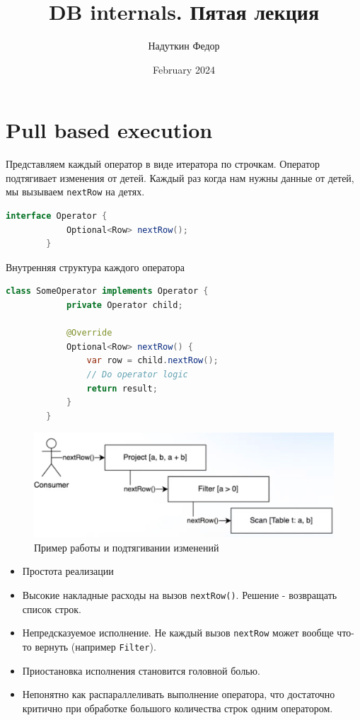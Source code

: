 \documentclass[11pt]{article}
\title{DB internals. Пятая
лекция}
\author{Надуткин Федор }
\date{February 2024}
\begin{document}
    \maketitle
    \newpage


    \section{Pull based execution}

    Представляем каждый оператор в виде итератора по строчкам.
    Оператор подтягивает изменения от детей.
    Каждый раз когда нам нужны данные от детей, мы вызываем \texttt{nextRow} на детях.

    \begin{lstlisting}[language=Java]
        interface Operator {
            Optional<Row> nextRow();
        }
    \end{lstlisting}

    Внутренняя структура каждого оператора

    \begin{lstlisting}[language=Java]
        class SomeOperator implements Operator {
            private Operator child;

            @Override
            Optional<Row> nextRow() {
                var row = child.nextRow();
                // Do operator logic
                return result;
            }
        }
    \end{lstlisting}

    \begin{figure}[h!]
        \centering
        \includegraphics[width=\textwidth]{Pictures/Pull/Consumer pulls}
        \caption{Пример работы и подтягивании изменений}
    \end{figure}

    \begin{itemize}[label=+]
        \item Простота реализации
    \end{itemize}
    \begin{itemize}[label=-]
        \item Высокие накладные расходы на вызов \texttt{nextRow()}.
        Решение - возвращать список строк.
        \item Непредсказуемое исполнение.
        Не каждый вызов \texttt{nextRow} может вообще что-то вернуть (например \texttt{Filter}).
        \item Приостановка исполнения становится головной болью.
        \item Непонятно как распараллеливать выполнение оператора, что достаточно критично при обработке большого количества строк одним оператором.
    \end{itemize}
\end{document}
